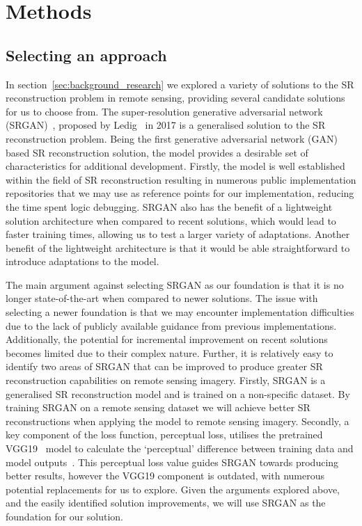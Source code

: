 \chapter{Methods}\label{chapter2}
\section{Selecting an approach}\label{sec:selecting_an_approach}
In section~\ref{sec:background_research} we explored a variety of solutions to the SR reconstruction problem in remote sensing, providing several candidate solutions for us to choose from. The super-resolution generative adversarial network (SRGAN)~\cite{srgan}, proposed by Ledig \etal\ in 2017 is a generalised solution to the SR reconstruction problem. Being the first generative adversarial network (GAN) based SR reconstruction solution, the model provides a desirable set of characteristics for additional development. Firstly, the model is well established within the field of SR reconstruction resulting in numerous public implementation repositories that we may use as reference points for our implementation, reducing the time spent logic debugging. SRGAN also has the benefit of a lightweight solution architecture when compared to recent solutions, which would lead to faster training times, allowing us to test a larger variety of adaptations. Another benefit of the lightweight architecture is that it would be able straightforward to introduce adaptations to the model.

The main argument against selecting SRGAN as our foundation is that it is no longer state-of-the-art when compared to newer solutions. The issue with selecting a newer foundation is that we may encounter implementation difficulties due to the lack of publicly available guidance from previous implementations. Additionally, the potential for incremental improvement on recent solutions becomes limited due to their complex nature. Further, it is relatively easy to identify two areas of SRGAN that can be improved to produce greater SR reconstruction capabilities on remote sensing imagery. Firstly, SRGAN is a generalised SR reconstruction model and is trained on a non-specific dataset. By training SRGAN on a remote sensing dataset we will achieve better SR reconstructions when applying the model to remote sensing imagery. Secondly, a key component of the loss function, perceptual loss, utilises the pretrained VGG19~\cite{vgg19} model to calculate the `perceptual' difference between training data and model outputs~\cite{srgan}. This perceptual loss value guides SRGAN towards producing better results, however the VGG19 component is outdated, with numerous potential replacements for us to explore. Given the arguments explored above, and the easily identified solution improvements, we will use SRGAN as the foundation for our solution.

